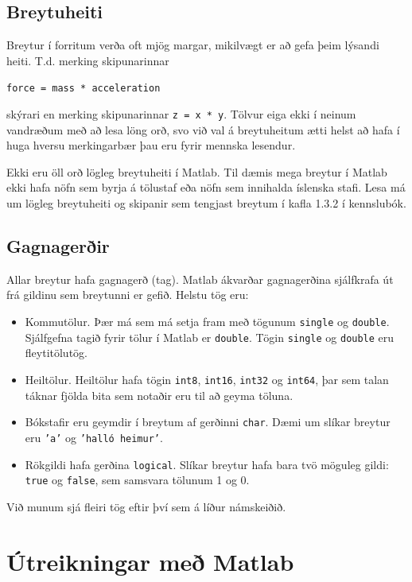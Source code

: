 \documentclass[justified,nobib]{tufte-handout}
\begin{document}
\subsection{Breytuheiti}

Breytur í forritum verða oft mjög margar, mikilvægt er að gefa þeim lýsandi heiti. T.d. merking skipunarinnar 
\begin{center}
    \texttt{force = mass * acceleration}
\end{center} 
skýrari en merking skipunarinnar \texttt{z = x * y}. Tölvur eiga ekki í neinum vandræðum með að lesa löng orð, svo við val á breytuheitum ætti helst að hafa í huga hversu merkingarbær þau eru fyrir mennska lesendur.

Ekki eru öll orð lögleg breytuheiti í Matlab. Til dæmis mega breytur í Matlab ekki hafa nöfn sem byrja á tölustaf eða nöfn sem innihalda íslenska stafi. Lesa má um lögleg breytuheiti og skipanir sem tengjast breytum í kafla 1.3.2 í kennslubók.

\subsection{Gagnagerðir}
Allar breytur hafa gagnagerð (tag). Matlab ákvarðar gagnagerðina sjálfkrafa út frá gildinu sem breytunni er gefið.
Helstu tög eru:
\begin{itemize}
\item Kommutölur. Þær má sem má setja fram með tögunum \texttt{single} og \texttt{double}. Sjálfgefna tagið fyrir tölur í Matlab er \texttt{double}. Tögin \texttt{single} og \texttt{double} eru fleytitölutög.
\item Heiltölur. Heiltölur hafa tögin \texttt{int8}, \texttt{int16}, \texttt{int32} og \texttt{int64}, þar sem talan táknar fjölda bita sem notaðir eru til að geyma töluna. 
\item Bókstafir  eru geymdir í breytum af gerðinni \texttt{char}. Dæmi um slíkar breytur eru \texttt{'a'} og \texttt{'halló heimur'}.
\item Rökgildi hafa gerðina \texttt{logical}. Slíkar breytur hafa bara tvö möguleg gildi: \texttt{true} og \texttt{false}, sem samsvara tölunum 1 og 0.
\end{itemize}
Við munum sjá fleiri tög eftir því sem á líður námskeiðið.

\section{Útreikningar með Matlab}
\end{document}
